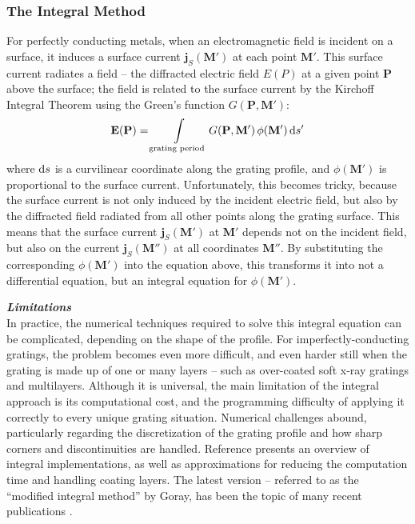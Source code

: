\subsubsection{The Integral Method}
For perfectly conducting metals, when an electromagnetic field is incident on a surface, it induces a surface current $\mathbf{j}_S(\mathbf{M}')$ at each point $\mathbf{M}'$.  This surface current radiates a field -- the diffracted electric field $E(P)$ at a given point $\mathbf{P}$ above the surface; the field is related to the surface current by the Kirchoff Integral Theorem \cite{Kir83} using the Green's function $G(\mathbf{P}, \mathbf{M}')$:
\begin{align}
\mathbf{E}(\mathbf{P}) = \int\limits_{\textrm{grating period}} G(\mathbf{P}, \mathbf{M}')\, \phi(\mathbf{M}')\, \mathrm{d} s'
\end{align}
where $\mathrm{d} s$ is a curvilinear coordinate along the grating profile, and $\phi(\mathbf{M'})$ is proportional to the surface current.  Unfortunately, this becomes tricky, because the surface current is not only induced by the incident electric field, but also by the diffracted field radiated from all other points along the grating surface.  This means that the surface current $\mathbf{j}_S(\mathbf{M}')$ at $\mathbf{M}'$ depends not on the incident field, but also on the current $\mathbf{j}_S(\mathbf{M}'')$ at all coordinates $\mathbf{M}''$.  By substituting the corresponding $\phi(\mathbf{M'})$ into the equation above, this transforms it into not a differential equation, but an integral equation for $\phi(\mathbf{M'})$.  
 
\noindent\textbf{\emph{Limitations}}\\
In practice, the numerical techniques required to solve this integral equation can be complicated, depending on the shape of the profile.  For imperfectly-conducting gratings, the problem becomes even more difficult, and even harder still when the grating is made up of one or many layers -- such as over-coated soft x-ray gratings and multilayers.  Although it is universal, the main limitation of the integral approach is its computational cost, and the programming difficulty of applying it correctly to every unique grating situation. Numerical challenges abound, particularly regarding the discretization of the grating profile and how sharp corners and discontinuities are handled.  Reference \cite{Pom91} presents an overview of integral implementations, as well as approximations for reducing the computation time and handling coating layers. The latest version -- referred to as the ``modified integral method'' by Goray, has been the topic of many recent publications \cite{Gor02} \cite {Gor02b} \cite{See02} \cite{Gor05}.
 
